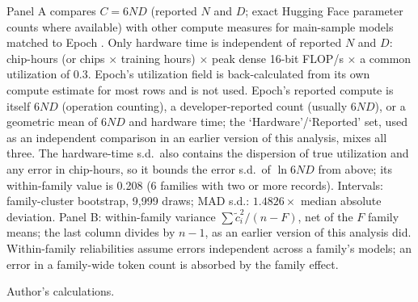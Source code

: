 \begin{table}[tp]
\begin{tablenotes}
Panel A compares $C=6ND$ (reported $N$ and $D$; exact Hugging Face parameter counts where available) with other compute measures for main-sample models matched to Epoch \citep{epochai2026data}. Only hardware time is independent of reported $N$ and $D$: chip-hours (or chips $\times$ training hours) $\times$ peak dense 16-bit FLOP/s $\times$ a common utilization of 0.3. Epoch's utilization field is back-calculated from its own compute estimate for most rows and is not used. Epoch's reported compute is itself $6ND$ (operation counting), a developer-reported count (usually $6ND$), or a geometric mean of $6ND$ and hardware time; the `Hardware'/`Reported' set, used as an independent comparison in an earlier version of this analysis, mixes all three. The hardware-time s.d.\ also contains the dispersion of true utilization and any error in chip-hours, so it bounds the error s.d.\ of $\ln 6ND$ from above; its within-family value is 0.208 (6 families with two or more records). Intervals: family-cluster bootstrap, 9,999 draws; MAD s.d.: $1.4826\times$ median absolute deviation. Panel B: within-family variance $\sum\tilde c_i^2/(n-F)$, net of the $F$ family means; the last column divides by $n-1$, as an earlier version of this analysis did. Within-family reliabilities assume errors independent across a family's models; an error in a family-wide token count is absorbed by the family effect.
\end{tablenotes}
\begin{tablenotes}[Source]
Author's calculations.
\end{tablenotes}
\end{table}
